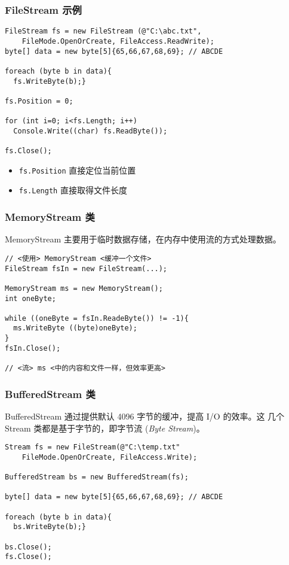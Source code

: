 \begin{frame}[fragile]
\frametitle{FileStream 示例}
\begin{lstlisting}
FileStream fs = new FileStream (@"C:\abc.txt", 
    FileMode.OpenOrCreate, FileAccess.ReadWrite);
byte[] data = new byte[5]{65,66,67,68,69}; // ABCDE

foreach (byte b in data){
  fs.WriteByte(b);}

fs.Position = 0; 

for (int i=0; i<fs.Length; i++)
  Console.Write((char) fs.ReadByte());

fs.Close();
\end{lstlisting}
\begin{itemize}
\item \texttt{fs.Position} 直接定位当前位置
\item \texttt{fs.Length} 直接取得文件长度
\end{itemize}
\end{frame}

\begin{frame}[fragile]
\frametitle{MemoryStream 类}
\CJKindent MemoryStream 主要用于临时数据存储，在内存中使用流的方式处理数据。
\begin{lstlisting}[escapeinside=<>]
// <使用> MemoryStream <缓冲一个文件>
FileStream fsIn = new FileStream(...);

MemoryStream ms = new MemoryStream();
int oneByte;

while ((oneByte = fsIn.ReadeByte()) != -1){
  ms.WriteByte ((byte)oneByte);
}
fsIn.Close();

// <流> ms <中的内容和文件一样，但效率更高>

\end{lstlisting}
\end{frame}

\begin{frame}[fragile]
\frametitle{BufferedStream 类}
\CJKindent BufferedStream 通过提供默认 4096 字节的缓冲，提高 I/O 的效率。这
几个 Stream 类都是基于字节的，即字节流 (\textit{Byte Stream})。
\begin{lstlisting}
Stream fs = new FileStream(@"C:\temp.txt"
    FileMode.OpenOrCreate, FileAccess.Write);

BufferedStream bs = new BufferedStream(fs);

byte[] data = new byte[5]{65,66,67,68,69}; // ABCDE

foreach (byte b in data){
  bs.WriteByte(b);}

bs.Close();
fs.Close();

\end{lstlisting}
\end{frame}

